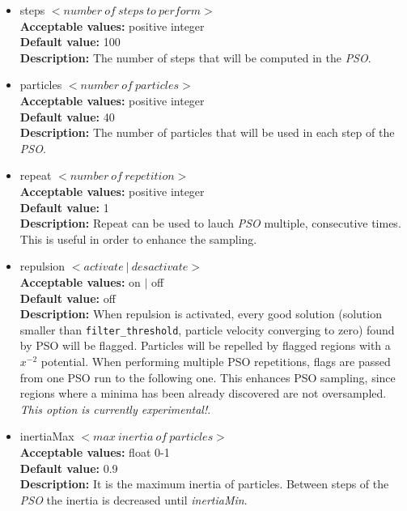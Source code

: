 \documentclass[a4paper, 12pt]{article}
\begin{document}
\begin{itemize}

\item steps $< number\ of\ steps\ to\ perform >$\\
\textbf{Acceptable values:} positive integer\\
\textbf{Default value:} 100\\
\textbf{Description:} The number of steps that will be computed in the \emph{PSO}.

\item particles $< number\ of\ particles >$\\
\textbf{Acceptable values:} positive integer\\
\textbf{Default value:} 40\\
\textbf{Description:} The number of particles that will be used in each step of the \emph{PSO}.

\item repeat $< number\ of\ repetition>$\\
\textbf{Acceptable values:} positive integer\\
\textbf{Default value:} 1\\
\textbf{Description:} Repeat can be used to lauch \emph{PSO} multiple, consecutive times. This is useful in order to enhance the sampling.

\item repulsion $< activate\ |\ desactivate >$\\
\textbf{Acceptable values:} on $|$ off\\
\textbf{Default value:} off\\
\textbf{Description:} When repulsion is activated, every good solution (solution smaller than \texttt{filter\_threshold}, particle velocity converging to zero) found by PSO will be flagged. Particles will be repelled by flagged regions with a $x^{-2}$ potential. When performing multiple PSO repetitions, flags are passed from one PSO run to the following one. This enhances PSO sampling, since regions where a minima has been already discovered are not oversampled. \emph{This option is currently experimental!}.

\item inertiaMax $< max\ inertia\ of\ particles >$\\
\textbf{Acceptable values:} float 0-1\\
\textbf{Default value:} 0.9\\
\textbf{Description:} It is the maximum inertia of particles. Between steps of the \emph{PSO} the inertia is decreased until \emph{inertiaMin}.


\end{itemize}
\end{document}
